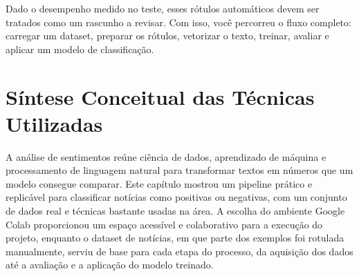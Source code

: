 \documentclass[a4paper,12pt,openany]{book}
\begin{document}
Dado o desempenho medido no teste, esses rótulos automáticos devem ser tratados como um rascunho a revisar. Com isso, você percorreu o fluxo completo: carregar um dataset, preparar os rótulos, vetorizar o texto, treinar, avaliar e aplicar um modelo de classificação.

\section{Síntese Conceitual das Técnicas Utilizadas}
A análise de sentimentos reúne ciência de dados, aprendizado de máquina e processamento de linguagem natural para transformar textos em números que um modelo consegue comparar. Este capítulo mostrou um pipeline prático e replicável para classificar notícias como positivas ou negativas, com um conjunto de dados real e técnicas bastante usadas na área. A escolha do ambiente Google Colab proporcionou um espaço acessível e colaborativo para a execução do projeto, enquanto o dataset de notícias, em que parte dos exemplos foi rotulada manualmente, serviu de base para cada etapa do processo, da aquisição dos dados até a avaliação e a aplicação do modelo treinado.
\end{document}
